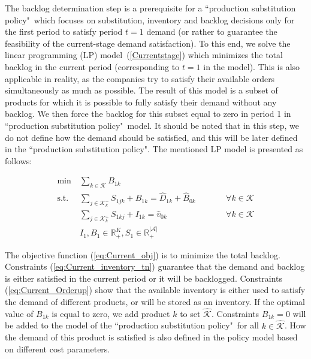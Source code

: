 \documentclass[11pt]{article}
\newcommand{\ti}{t} %
\newcommand{\ka}{k} %
\newcommand{\KA}{\mathcal{K}}
\newcommand{\Ka}{K}
\newcommand{\jey}{j} %
\newcommand{\Graf}{\mathcal{A}} %
\newcommand{\Csub}{\mathcal{K}^+_k}
\newcommand{\Psub}{\mathcal{K}^-_k}
\newcommand{\tAct}{\hat{\ti}} %
\newcommand{\PSpolicy}{``production substitution policy"}
\begin{document}
The backlog determination step is a prerequisite for a \PSpolicy \ which focuses on substitution, inventory and backlog decisions only for the first period to satisfy period $\ti =1$ demand {(or rather to guarantee the feasibility of the current-stage demand satisfaction).} 
To this end, we solve the linear programming (LP) model~(\ref{Currentstage}) which minimizes the total backlog in the current period (corresponding to $\ti=1$ in the model). This is also applicable in reality, as the companies try to satisfy their available orders simultaneously as much as possible. The result of this model is a subset of products for which it is possible to fully satisfy their demand without any backlog. We then force the backlog for this subset equal to zero in period 1 in \PSpolicy \ model. 
It should be noted that in this step, we do not define how the demand should be satisfied, and this will be later defined in the \PSpolicy. The mentioned LP model is presented as follows:


\begin{subequations}
\label{Currentstage}

\begin{alignat}{2}
\min \ & \sum_{\ka \in \KA}  {B}_{ 1 \ka}  \label{eq:Current_obj} \\
 \text{s.t.} \ &   \sum_{\jey \in  \Psub} {S}_{1  \jey \ka} + B_{1 \ka}  = \hat{D}_{1 \ka} + \hat{B}_{0 \ka} &&\qquad\forall \ka \in \KA       \label{eq:Current_inventory_tn}\\
&  \sum_{\jey \in  \Csub} {S}_{1 \ka \jey} + I_{ 1 \ka} = \hat{v}_{ 0 \ka} &&\qquad\forall \ka \in \KA      \label{eq:Current_Orderup}\\
& {I}_{ 1 }, {B}_{ 1 } \in \mathbb{R}_{+}^{\Ka} , {S}_{1} \in \mathbb{R}_{+}^{|\Graf|}  \label{eq:Current_bound2}
\end{alignat}
\end{subequations}

The objective function (\ref{eq:Current_obj}) is to minimize the total backlog. Constraints (\ref{eq:Current_inventory_tn}) guarantee that the demand and backlog is either satisfied in the current period or it will be backlogged. Constraints (\ref{eq:Current_Orderup}) show that the available inventory is either used to satisfy the demand of different products, or will be stored as an inventory.
If the optimal value of  $B_{ 1 \ka}$  is equal to zero, we add product $\ka$ to set $\hat{\KA}$. Constraints $B_{ 1 \ka} = 0$ will be added to the model of the \PSpolicy \ for all $ \ka \in \hat{\KA}$. How the demand of this product is satisfied is also defined in the policy model based on different cost parameters.
\end{document}
